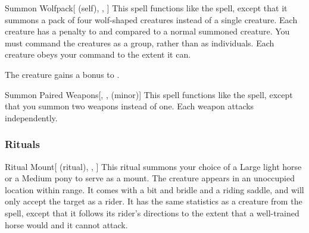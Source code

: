 \lowercase{\hypertarget{spell:Summon Wolfpack}{}}\label{spell:Summon Wolfpack}
\begin{attuneability}[Rank 5]{\hypertarget{spell:Summon Wolfpack}{Summon Wolfpack}}[ (self), , ]
This spell functions like the  spell, except that it summons a pack of four wolf-shaped creatures instead of a single creature.
Each creature has a  penalty to  and  compared to a normal summoned creature.
You must command the creatures as a group, rather than as individuals.
Each creature obeys your command to the extent it can.

\rankline
{} The creature gains a  bonus to .
\end{attuneability}
\vspace{0.25em}



\lowercase{\hypertarget{spell:Summon Paired Weapons}{}}\label{spell:Summon Paired Weapons}
\begin{freeability}[Rank 8]{\hypertarget{spell:Summon Paired Weapons}{Summon Paired Weapons}}[, ,  (minor)]
This spell functions like the  spell, except that you summon two weapons instead of one.
Each weapon attacks independently.
\end{freeability}
\vspace{0.25em}



\subsubsection{Rituals}


\lowercase{\hypertarget{spell:Ritual Mount}{}}\label{spell:Ritual Mount}
\begin{attuneability}[Rank 3]{\hypertarget{spell:Ritual Mount}{Ritual Mount}}[ (ritual), , ]
This ritual summons your choice of a Large light horse or a Medium pony to serve as a mount.
The creature appears in an unoccupied location within \rngclose range.
It comes with a bit and bridle and a riding saddle, and will only accept the target as a rider.
It has the same statistics as a creature from the  spell, except that it follows its rider's directions to the extent that a well-trained horse would and it cannot attack.
\end{attuneability}
\vspace{0.25em}


